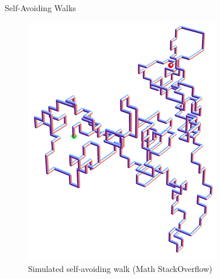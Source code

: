\documentclass{if-beamer}
\begin{document}
\begin{frame}{Self-Avoiding Walks}
    \begin{figure}
        \centering
        \begin{minipage}{0.3\textwidth}
            \centering
            \includegraphics[width=\textwidth]{figures/SAW.jpg}
            \caption{Simulated self-avoiding walk (Math StackOverflow)}
        \end{minipage}
        \hfill
        \begin{minipage}{0.37\textwidth}
            \centering

\end{minipage}
\end{figure}
\end{frame}
\end{document}
